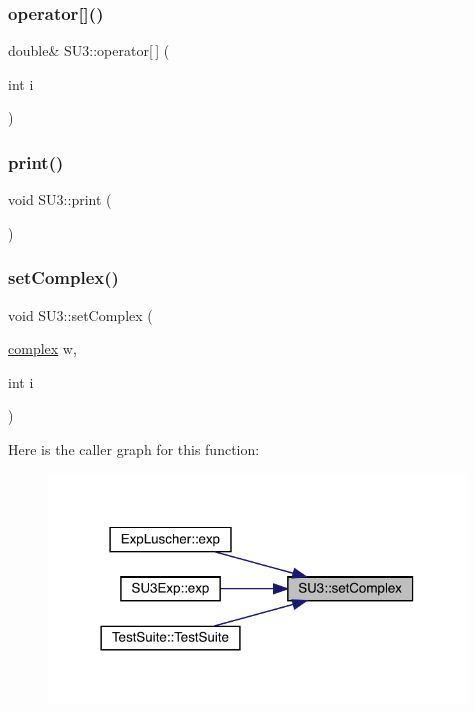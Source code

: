 \mbox{\label{class_s_u3_a44d830566de4abc27eeea8dd338b0528}} 
\subsubsection{\texorpdfstring{operator[]()}{operator[]()}}
{\footnotesize\ttfamily double\& S\+U3\+::operator\mbox{[}$\,$\mbox{]} (\begin{DoxyParamCaption}\item[{int}]{i }\end{DoxyParamCaption})\hspace{0.3cm}{\ttfamily [inline]}}

\mbox{\label{class_s_u3_a40d6e853cd73f87b4113e22a53d45e89}} 
\subsubsection{\texorpdfstring{print()}{print()}}
{\footnotesize\ttfamily void S\+U3\+::print (\begin{DoxyParamCaption}{ }\end{DoxyParamCaption})}

\mbox{\label{class_s_u3_a794ecde931082d02f625cab14d0e83e3}} 
\subsubsection{\texorpdfstring{setComplex()}{setComplex()}}
{\footnotesize\ttfamily void S\+U3\+::set\+Complex (\begin{DoxyParamCaption}\item[{\mbox{\hyperlink{classcomplex}{complex}}}]{w,  }\item[{int}]{i }\end{DoxyParamCaption})}

Here is the caller graph for this function\+:
\nopagebreak
\begin{figure}[H]
\begin{center}
\leavevmode
\includegraphics[width=314pt]{class_s_u3_a794ecde931082d02f625cab14d0e83e3_icgraph}
\end{center}
\end{figure}
\mbox{\label{class_s_u3_ac1c6438d29178aa1255ee4f2f48d2430}} 
